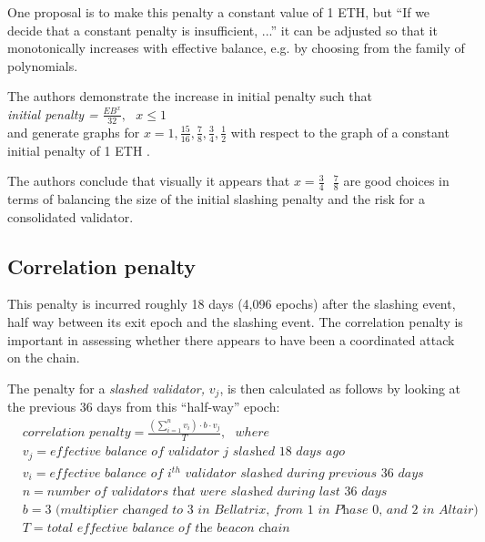\documentclass{article}
\begin{document}
One proposal is to make this penalty a constant value of 1 ETH, but ``If we
decide that a constant penalty is insufficient, ...'' it can be adjusted so
that it monotonically increases with effective balance, e.g. by choosing from
the family of polynomials.


The authors demonstrate the increase in initial penalty such that \\
\textit{initial penalty =} $\frac{EB^x}{32}, \texttt{ } x \leqslant 1$ \\

and generate graphs for $x=1, \frac{15}{16}, \frac{7}{8}, \frac{3}{4},
\frac{1}{2}$ with respect to the graph of a constant initial penalty of 1 ETH
\cite{Neuder2023d}.

The authors conclude that visually it appears that $x = \frac{3}{4} \texttt{ }
\frac{7}{8}$ are good choices in terms of balancing the size of the initial
slashing penalty and the risk for a consolidated validator.

\subsection{Correlation penalty}
This penalty is incurred roughly 18 days (4,096 epochs) after the slashing
event, half way between its exit epoch and the slashing event. The correlation
penalty is important in assessing whether there appears to have been a
coordinated attack on the chain.

The penalty for a \textit{slashed validator,} $ v_j$, is then calculated as
follows by looking at the previous 36 days from this ``half-way'' epoch:
\begin{equation*}
  \begin{split}
& \textit{correlation penalty} = \frac{\left( \sum_{i=1}^n v_i  \right) \cdot  b \cdot  v_j}{T}, \texttt{ } where \\
& v_j = \textit{effective balance of validator j slashed 18 days ago} \\
& v_i = \textit{effective balance of } i^{th} \textit{ validator slashed during previous 36 days} \\
& n = \textit{number of validators that were slashed during last 36 days} \\
& b =3 \textit{ (multiplier changed to 3 in Bellatrix, from 1  in Phase 0, and 2 in Altair)} \\
& T = \textit{total effective balance of the beacon chain}
  \end{split}
\end{equation*}
\end{document}

